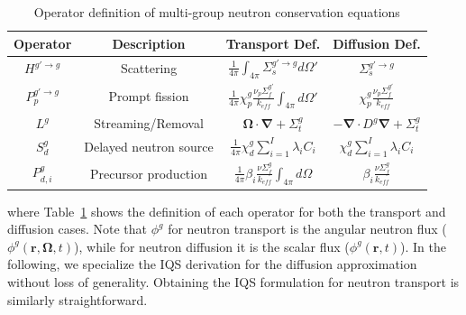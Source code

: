 \documentclass{elsarticle}
\renewcommand{\vec}[1]{\bm{#1}} %
\newcommand{\bs}[1]{\mathbf{#1}}
\renewcommand{\div}{\bs{\nabla}\! \cdot \!}
\newcommand{\grad}{\bs{\nabla}}
\newcommand{\tbl}[1]{Table~\ref{#1}}                     %
\newcommand{\keff}{k_\textit{eff}}
\begin{document}
\begin{table}[htbp!]
\centering
\caption{Operator definition of multi-group neutron conservation equations}
\label{tab:op_def}
\def\arraystretch{2}
\begin{tabular}{|c|c|c|c|}
\hline
Operator & Description & Transport Def. & Diffusion Def. \\
\hline
$H^{g'\to g}$ & Scattering & $\frac{1}{4\pi}\int_{4\pi}\Sigma_s^{g'\rightarrow g}d\Omega '$ & $\Sigma_s^{g'\rightarrow g}$ \\
\hline
$P_p^{g'\to g}$ & Prompt fission & $\frac{1}{4\pi}\chi_p^{g}\frac{\nu_p\Sigma_f^{g'}}{\keff}\int_{4\pi}d\Omega '$ & $\chi_p^{g}\frac{\nu_p\Sigma_f^{g'}}{\keff}$ \\
\hline
$L^g$ & Streaming/Removal & $\vec \Omega \cdot \grad + \Sigma_t^g$ & $-\div D^g \grad + \Sigma_t^g$ \\
\hline
$S_d^g$ & Delayed neutron source & $\frac{1}{4\pi}\chi_d^g\sum_{i=1}^I\lambda_iC_i$ & $\chi_d^g\sum_{i=1}^I\lambda_iC_i$ \\
\hline
$P_{d,i}^g$ & Precursor production & $\frac{1}{4\pi}\beta_i\frac{\nu\Sigma_f^{g}}{\keff}\int_{4\pi}d\Omega$ & $\beta_i\frac{\nu\Sigma_f^{g}}{\keff}$ \\
\hline
\end{tabular}
\end{table}
%
\noindent
where \tbl{tab:op_def} shows the definition of each operator for both the transport and diffusion cases. Note that $\phi^g$ for neutron transport is the angular neutron flux ($\phi^g(\vec r, \vec\Omega, t)$), while for neutron diffusion it is the scalar flux ($\phi^g(\vec r, t)$).  
In the following, we specialize the 
IQS derivation for the diffusion approximation without loss of generality. Obtaining the IQS formulation for neutron transport is similarly straightforward.
\end{document}
